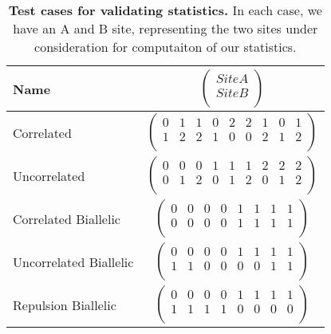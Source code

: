 \documentclass[12pt]{article}
\begin{document}
\begin{table}[H]
  \centering
  \begin{tabular}{lc} Name & $\left(\begin{array}{cc} Site A \\ Site B
                                     \\ \end{array}\right)$ \\

    \hline
    Correlated & $\left(\begin{array}{ccccccccc}
                          0 & 1 & 1 & 0 & 2 & 2 & 1 & 0 & 1 \\
                          1 & 2 & 2 & 1 & 0 & 0 & 2 & 1 & 2 \\
                        \end{array}\right)$ \\
    Uncorrelated & $\left(\begin{array}{ccccccccc}
                            0 & 0 & 0 & 1 & 1 & 1 & 2 & 2 & 2 \\
                            0 & 1 & 2 & 0 & 1 & 2 & 0 & 1 & 2 \\
                          \end{array}\right)$ \\
    Correlated Biallelic & $\left(\begin{array}{cccccccc}
                                    0 & 0 & 0 & 0 & 1 & 1 & 1 & 1 \\
                                    0 & 0 & 0 & 0 & 1 & 1 & 1 & 1 \\
                                  \end{array}\right)$ \\
    Uncorrelated Biallelic & $\left(\begin{array}{cccccccc}
                                      0 & 0 & 0 & 0 & 1 & 1 & 1 & 1 \\
                                      1 & 1 & 0 & 0 & 0 & 0 & 1 & 1 \\
                                    \end{array}\right)$ \\
    Repulsion Biallelic & $\left(\begin{array}{cccccccc}
                                   0 & 0 & 0 & 0 & 1 & 1 & 1 & 1 \\
                                   1 & 1 & 1 & 1 & 0 & 0 & 0 & 0 \\
                                 \end{array}\right)$ \\
  \end{tabular}
  \caption{
    \textbf{Test cases for validating statistics.}
    In each case, we have an A and B site, representing the two sites under
    consideration for computaiton of our statistics.
  }
  \label{table:test_cases}
\end{table}
\end{document}
